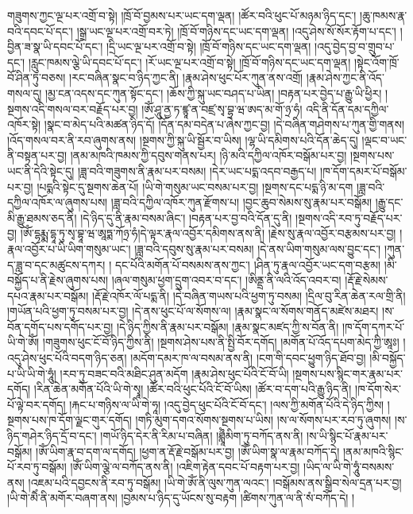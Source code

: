 གཟུགས་ཀྱང་ལྔ་པར་འགྲོ་བ་སྟེ། །ཁྲོ་བོ་བྱམས་པར་ཡང་དག་ལྡན། །ཚོར་བའི་ཕུང་པོ་མཉམ་ཉིད་དང་། །ཆུ་ཁམས་རྣ་བའི་དབང་པོ་དང་། །སྒྲ་ཡང་ལྔ་པར་འགྲོ་བར་ཏེ། །ཁྲོ་བོ་གཉིས་དང་ཡང་དག་ལྡན། །འདུ་ཤེས་སོ་སོར་རྟོག་པ་དང་། །བྱིན་ཟ་སྣ་ཡི་དབང་པོ་དང་། །དྲི་ཡང་ལྔ་པར་འགྲོ་བ་སྟེ། །ཁྲོ་བོ་གཉིས་དང་ཡང་དག་ལྡན། །འདུ་བྱེད་བྱ་བ་གྲུབ་པ་དང་། །རླུང་ཁམས་ལྕེ་ཡི་དབང་པོ་དང་། །རོ་ཡང་ལྔ་པར་འགྲོ་བ་སྟེ། །ཁྲོ་བོ་གཉིས་དང་ཡང་དག་ལྡན། །སྟེང་འོག་ཁྲོ་བོ་ཤིན་ཏུ་བཅས། །རང་བཞིན་སྣང་བ་ཉིད་ཀྱང་ནི། །རྣམ་ཤེས་ཕུང་པོར་ཀུན་ནས་འགྲོ། །རྣམ་ཤེས་ཀྱང་ནི་འོད་གསལ་དུ། །མྱ་ངན་འདས་དང་ཀུན་སྟོང་དང་། །ཆོས་ཀྱི་སྐུ་ཡང་བཤད་པ་ཡིན། །བརྟན་པར་བྱེད་པ་རྒྱུ་ཡི་ཕྱིར། །སྔགས་འདི་གསལ་བར་བརྗོད་པར་བྱ། །ཨོཾ་ཤཱུ་ནྱ་ཏ་ཛྙཱ་ན་བཛྲ་སྭ་བྷྭ་ཝ་ཨད་མ་གོ་ཉྲ་ཧཾ། འདི་ནི་དོན་དམ་དཀྱིལ་འཁོར་སྟེ། །སྣང་བ་མེད་པའི་མཚན་ཉིད་དོ། །དོན་དམ་བདེན་པ་ཞེས་ཀྱང་བྱ། །དེ་བཞིན་གཤེགས་པ་ཀུན་གྱི་གནས། །འོད་གསལ་བར་ནི་རབ་ཞུགས་ནས། །སྔགས་ཀྱི་སྐུ་ཡི་སྦྱོར་བ་ཡིས། །ལྷ་ཡི་དམིགས་པའི་དོན་ཆེད་དུ། །ལྡང་བ་ཡང་ནི་བསྟན་པར་བྱ། །ནམ་མཁའི་ཁམས་ཀྱི་དབུས་གནས་པར། །ཉི་མའི་དཀྱིལ་འཁོར་བསྒོམ་པར་བྱ། །སྔགས་པས་ཡང་ནི་དེའི་སྟེང་དུ། །ཟླ་བའི་གཟུགས་ནི་རྣམ་པར་བསམ། །དེར་ཡང་པདྨ་འདབ་བརྒྱད་པ། །ཁ་དོག་དམར་པོ་བསྒོམ་པར་བྱ། །པདྨའི་སྟེང་དུ་སྔགས་ཆེན་པོ། །ཡི་གེ་གསུམ་ཡང་བསམ་པར་བྱ། །སྔགས་དང་པདྨ་ཉི་མ་དག །ཟླ་བའི་དཀྱིལ་འཁོར་ལ་ཞུགས་པས། །ཟླ་བའི་དཀྱིལ་འཁོར་ཀུན་རྫོགས་པ། །བྱང་ཆུབ་སེམས་སུ་རྣམ་པར་བསྒོམ། །རྒྱུ་དང་མི་རྒྱུ་ཐམས་ཅད་ནི། །དེ་ཉིད་དུ་ནི་རྣམ་བསམ་ཞིང་། །བརྟན་པར་བྱ་བའི་དོན་དུ་ནི། །སྔགས་འདི་རབ་ཏུ་བརྗོད་པར་བྱ། །ཨོཾ་དྷརྨྨ་དྷཱ་ཏུ་སྭ་བྷཱ་ཝ་ཨཱཏྨ་ཀོཉྲ་ཧཾ།དེ་ལྟར་རྣལ་འབྱོར་དམིགས་ནས་ནི། །རྗེས་སུ་རྣལ་འབྱོར་བརྩམས་པར་བྱ། །རྣལ་འབྱོར་པ་ཡི་ཡིག་གསུམ་ཡང་། །ཟླ་བའི་དབུས་སུ་རྣམ་པར་བསམ། །དེ་ནས་ཡིག་གསུམ་ལས་བྱུང་དང་། །ཀུན་ད་ཟླ་བ་དང་མཚུངས་དཀར། །
དང་པོའི་མགོན་པོ་བསམས་ནས་ཀྱང་། །ཤིན་ཏུ་རྣལ་འབྱོར་ཡང་དག་བརྩམ། །མི་བསྐྱོད་པ་ནི་རྗེས་ཞུགས་པས། །ཞལ་གསུམ་ཕྱག་དྲུག་འབར་བ་དང་། །ཨིནྡྲ་ནི་ལའི་འོད་འབར་བ། །རྡོ་རྗེ་སེམས་དཔའ་རྣམ་པར་བསྒོམ། །རྡོ་རྗེ་འཁོར་ལོ་པདྨ་ནི། །དེ་བཞིན་གཡས་པའི་ཕྱག་ཏུ་བསམ། །དྲིལ་བུ་རིན་ཆེན་རལ་གྲི་ནི། །གཡོན་པའི་ཕྱག་ཏུ་བསམ་པར་བྱ། །དེ་ནས་ཕུང་པོ་ལ་སོགས་ལ། །རྣམ་སྣང་ལ་སོགས་གནོད་མཛེས་མཐར། །ས་བོན་དགོད་པས་དགོད་པར་བྱ། །དེ་ཉིད་ཀྱིས་ནི་རྣམ་པར་བསྒོམ། །རྣམ་སྣང་མཛད་ཀྱི་ས་བོན་ནི། །ཁ་དོག་དཀར་པོ་ཡི་གེ་ཨོཾ། །གཟུགས་ཕུང་ངོ་བོ་ཉིད་ཀྱིས་ནི། །སྔགས་ཤེས་པས་ནི་སྤྱི་བོར་དགོད། །མགོན་པོ་འོད་དཔག་མེད་ཀྱི་ཨཱཿ། །འདུ་ཤེས་ཕུང་པོའི་བདག་ཉིད་ཅན། །མདོག་དམར་ཁ་ལ་བསམ་ནས་ནི། །ངག་གི་དབང་ཕྱུག་ཉིད་ཐོབ་བྱ། །མི་བསྐྱོད་པ་ཡི་ཡི་གེ་ཧཱུཾ། །རབ་ཏུ་བཟང་བའི་མཐིང་ཤུན་མདོག །རྣམ་ཤེས་ཕུང་པོའི་ངོ་བོ་ཡི། །སྔགས་པས་སྙིང་གར་རྣམ་པར་དགོད། །རིན་ཆེན་མགོན་པོའི་ཡི་གེ་སྭཱ། །ཚོར་བའི་ཕུང་པོའི་ངོ་བོ་ཡིས། །ཚོར་བ་དག་པའི་རྒྱུ་ཉིད་ནི། །ཁ་དོག་སེར་པོ་ལྟེ་བར་དགོད། །རྐང་པ་གཉིས་ལ་ཡི་གེ་ཧཱ། །འདུ་བྱེད་ཕུང་པོའི་ངོ་བོ་དང་། །ལས་ཀྱི་མགོན་པོའི་དེ་ཉིད་ཀྱིས། །སྔགས་པས་ཁ་དོག་ལྗང་གུར་དགོད། །གཏི་མུག་དགའ་སོགས་སྔགས་པ་ཡིས། །ས་ལ་སོགས་པར་རབ་ཏུ་ཞུགས། །ས་ཉིད་གཤེར་ཉིད་དྲོ་བ་དང་། །གཡོ་ཉིད་དེར་ནི་རིམ་པ་བཞིན། །ཐླཱྀཾམིག་ཏུ་བཀོད་ནས་ནི། །ས་ཡི་སྙིང་པོ་རྣམ་པར་བསྒོམ། །ཨོཾ་ཡིག་རྣ་བ་དག་ལ་དགོད། །ཕྱག་ན་རྡོ་རྗེ་བསྒོམ་པར་བྱ། །ཨོཾ་ཡིག་སྣ་ལ་རྣམ་བཀོད་དེ། །ནམ་མཁའི་སྙིང་པོ་རབ་ཏུ་བསྒོམ། །ཨོཾ་ཡིག་ལྕེ་ལ་བཀོད་ནས་ནི། །འཇིག་རྟེན་དབང་པོ་བརྟག་པར་བྱ། །ཡིད་ལ་ཡི་གེ་ཧཱུཾ་བསམས་ནས། །འཇམ་པའི་དབྱངས་ནི་རབ་ཏུ་བསྒོམ། །ཡི་གེ་ཨོཾ་ནི་ལུས་ཀུན་ལའང་། །བསྒོམས་ནས་སྒྲིབ་སེལ་དྲན་པར་བྱ། །ཡི་གེ་མཻཾ་ནི་མགོར་བཞག་ནས། །བྱམས་པ་ཉིད་དུ་ཡོངས་སུ་བརྟག །ཚིགས་ཀུན་ལ་ནི་སཾ་བཀོད་དེ། །
